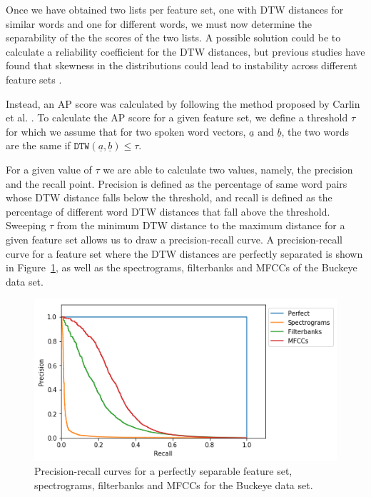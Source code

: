 Once we have obtained two lists per feature set, one with DTW distances for similar words and one for different words, we must now determine the separability of the the scores of the two lists.
A possible solution could be to calculate a reliability coefficient for the DTW distances\cite{reliability}, but previous studies have found that skewness in the distributions could lead to instability across different feature sets \cite{DBLP:conf/interspeech/CarlinTJH11}.

Instead, an AP score was calculated by following the method proposed by Carlin et al. \cite{DBLP:conf/interspeech/CarlinTJH11}. To calculate the AP score for a given feature set, we define a threshold $\tau$ for which we assume that for two spoken word vectors, $\underline{a}$ and $\underline{b}$, the two words are the same if $\mathtt{DTW}(\underline{a}, \underline{b}) \leq \tau$. 

For a given value of $\tau$ we are able to calculate two values, namely, the precision and the recall point.
Precision is defined as the percentage of same word pairs whose DTW distance falls below the threshold, and recall is defined as the percentage of different word DTW distances that fall above the threshold.
Sweeping $\tau$ from the minimum DTW distance to the maximum distance for a given feature set allows us to draw a precision-recall curve.
A precision-recall curve for a feature set where the DTW distances are perfectly separated is shown in Figure~\ref{fig:pr-curve}, as well as the spectrograms, filterbanks and MFCCs of the Buckeye data set.

\begin{figure}[h]
    \centering
    \includegraphics[width=0.8\linewidth]{content/fig/pr_curve.png}
    \caption{Precision-recall curves for a perfectly separable feature set, spectrograms, filterbanks and MFCCs for the Buckeye data set.}
    \label{fig:pr-curve}
\end{figure}

